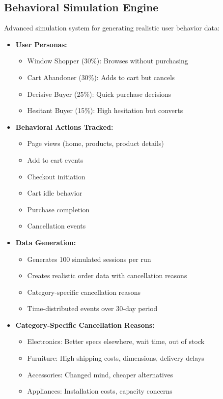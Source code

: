 \documentclass[12pt,a4paper]{article}
\begin{document}
\subsection{Behavioral Simulation Engine}

Advanced simulation system for generating realistic user behavior data:

\begin{itemize}[leftmargin=*]
    \item \textbf{User Personas:}
    \begin{itemize}
        \item Window Shopper (30\%): Browses without purchasing
        \item Cart Abandoner (30\%): Adds to cart but cancels
        \item Decisive Buyer (25\%): Quick purchase decisions
        \item Hesitant Buyer (15\%): High hesitation but converts
    \end{itemize}

    
    \item \textbf{Behavioral Actions Tracked:}
    \begin{itemize}
        \item Page views (home, products, product details)
        \item Add to cart events
        \item Checkout initiation
        \item Cart idle behavior
        \item Purchase completion
        \item Cancellation events
    \end{itemize}
    
    \item \textbf{Data Generation:}
    \begin{itemize}
        \item Generates 100 simulated sessions per run
        \item Creates realistic order data with cancellation reasons
        \item Category-specific cancellation reasons
        \item Time-distributed events over 30-day period
    \end{itemize}
    
    \item \textbf{Category-Specific Cancellation Reasons:}
    \begin{itemize}
        \item Electronics: Better specs elsewhere, wait time, out of stock
        \item Furniture: High shipping costs, dimensions, delivery delays
        \item Accessories: Changed mind, cheaper alternatives
        \item Appliances: Installation costs, capacity concerns
    \end{itemize}
\end{itemize}
\end{document}
